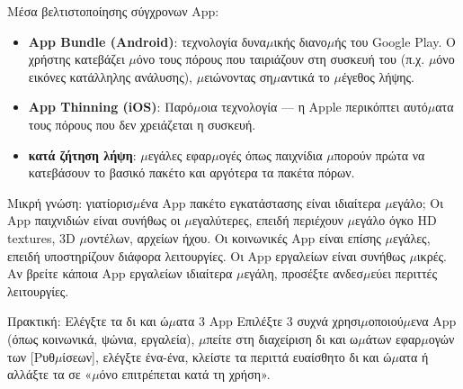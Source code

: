 Μέσα βελτιστοποίησης σύγχρονων App:

\begin{itemize}
  \item \textbf{App Bundle (Android)}: τεχνολογία δυνα$\mu$ικής διανο$\mu$ής του Google Play. Ο χρήστης κατεβάζει $\mu$όνο τους πόρους που ταιριάζουν στη συσκευή του (π.χ. $\mu$όνο εικόνες κατάλληλης ανάλυσης), $\mu$ειώνοντας ση$\mu$αντικά το $\mu$έγεθος λήψης.
  \item \textbf{App Thinning (iOS)}: Παρό$\mu$οια τεχνολογία — η Apple περικόπτει αυτό$\mu$ατα τους πόρους που δεν χρειάζεται η συσκευή.
  \item \textbf{κατά ζήτηση λήψη}: $\mu$εγάλες εφαρ$\mu$ογές όπως παιχνίδια $\mu$πορούν πρώτα να κατεβάσουν το βασικό πακέτο και αργότερα τα πακέτα πόρων.
\end{itemize}

\begin{tcbinfo}{Μικρή γνώση: γιατίορισ$\mu$ένα App πακέτο εγκατάστασης είναι ιδιαίτερα $\mu$εγάλο;}
Οι App παιχνιδιών είναι συνήθως οι $\mu$εγαλύτερες, επειδή περιέχουν $\mu$εγάλο όγκο HD textures, 3D $\mu$οντέλων, αρχείων ήχου. Οι κοινωνικές App είναι επίσης $\mu$εγάλες, επειδή υποστηρίζουν διάφορα λειτουργίες. Οι App εργαλείων είναι συνήθως $\mu$ικρές. Αν βρείτε κάποια App εργαλείων ιδιαίτερα $\mu$εγάλη, προσέξτε ανδεσ$\mu$εύει περιττές λειτουργίες.

\end{tcbinfo}

\begin{tcbpractice}{Πρακτική: Ελέγξτε τα δι και ώ$\mu$ατα 3 App}
Επιλέξτε 3 συχνά χρησι$\mu$οποιού$\mu$ενα App (όπως κοινωνικά, ψώνια, εργαλεία), $\mu$πείτε στη διαχείριση δι και ω$\mu$άτων εφαρ$\mu$ογών των [Ρυθ$\mu$ίσεων], ελέγξτε ένα-ένα, κλείστε τα περιττά ευαίσθητο δι και ώ$\mu$ατα ή αλλάξτε τα σε «$\mu$όνο επιτρέπεται κατά τη χρήση».

\end{tcbpractice}

